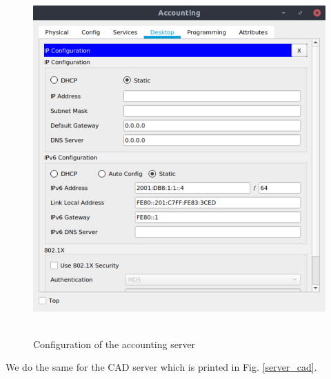 \documentclass[conference]{IEEEtran}
\begin{document}
\begin{center}
\begin{figure}[h]
\includegraphics[scale=0.45]{resources/q21.png}\
\caption{Configuration of the accounting server}
\label{server_acc}
\end{figure}
\end{center}

We do the same for the CAD server which is printed in Fig. \ref{server_cad}.
\end{document}
